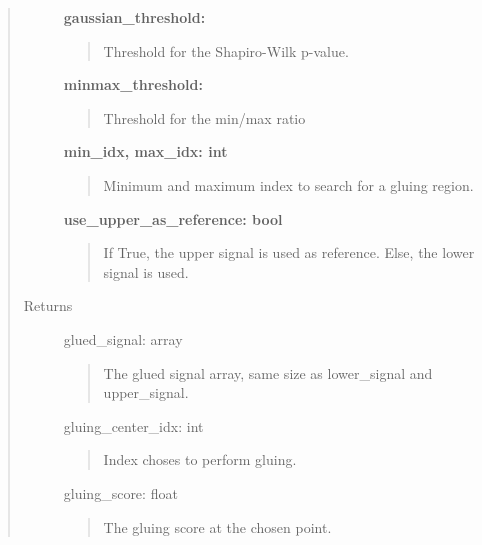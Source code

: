 \documentclass[letterpaper,10pt,english]{sphinxmanual}
\begin{document}
\begin{fulllineitems}
\begin{quote}
\begin{description}
\textbf{gaussian\_threshold:}
\begin{quote}

Threshold for the Shapiro-Wilk p-value.
\end{quote}

\textbf{minmax\_threshold:}
\begin{quote}

Threshold for the min/max ratio
\end{quote}

\textbf{min\_idx, max\_idx: int}
\begin{quote}

Minimum and maximum index to search for a gluing region.
\end{quote}

\textbf{use\_upper\_as\_reference: bool}
\begin{quote}

If True, the upper signal is used as reference. Else, the lower signal is used.
\end{quote}

\item[{Returns}] \leavevmode
glued\_signal: array
\begin{quote}

The glued signal array, same size as lower\_signal and upper\_signal.
\end{quote}

gluing\_center\_idx: int
\begin{quote}

Index choses to perform gluing.
\end{quote}

gluing\_score: float
\begin{quote}

The gluing score at the chosen point.
\end{quote}

\end{description}\end{quote}

\end{fulllineitems}

\end{document}
